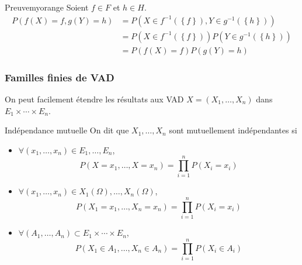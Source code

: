     \begin{omed}{Preuve}{myorange}
        Soient $f \in F$ et $h \in H$.
        \begin{align*}
            P(f(X) = f, g(Y) = h) &= P(X \in f^{-1}(\left\{f\right\}), Y \in g^{-1}(\left\{h\right\})) \\
            &= P(X \in f^{-1}(\left\{f\right\}))P(Y \in g^{-1}(\left\{h\right\})) \\
            &= P(f(X) = f) P(g(Y) = h)
        \end{align*}
    \end{omed}

    \subsubsection{Familles finies de VAD}

    On peut facilement étendre les résultats aux VAD $X = (X_1,\ldots,X_n)$ dans $E_1 \times \cdots \times E_n$.

    \begin{defitheo}{Indépendance mutuelle}{}
        On dit que $X_1, \ldots, X_n$ sont mutuellement indépendantes si 
        \begin{itemize}
            \item $\forall (x_1,\ldots,x_n) \in E_1, \ldots, E_n$,
            \[ P(X = x_1,\ldots,X=x_n) = \prod_{i =1}^n P(X_i = x_i) \]  
            \item $\forall (x_1,\ldots,x_n) \in X_1(\Omega), \ldots, X_n(\Omega)$, 
            \[ P(X_1 = x_1,\ldots,X_n=x_n) = \prod_{i =1}^n P(X_i = x_i) \]  
            \item $\forall (A_1,\ldots,A_n) \subset E_1 \times \cdots \times E_n$, 
            \[ P(X_1 \in A_1, \ldots, X_n \in A_n) = \prod_{i = 1}^n P(X_i \in A_i) \]   
        \end{itemize}
    \end{defitheo}

